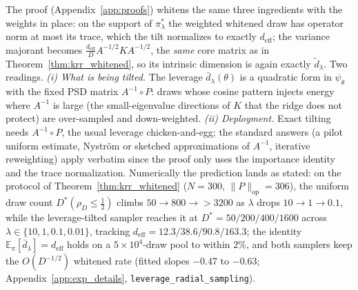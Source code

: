 \documentclass{article}
\begin{document}
\noindent The proof (Appendix~\ref{app:proofs}) whitens the same three ingredients with the weights in place: on the support of $\pi^*_\lambda$ the weighted whitened draw has operator norm at most its trace, which the tilt normalizes to exactly $d_{\mathrm{eff}}$; the variance majorant becomes $\frac{d_{\mathrm{eff}}}{D}A^{-1/2}KA^{-1/2}$, the \emph{same} core matrix as in Theorem~\ref{thm:krr_whitened}, so its intrinsic dimension is again exactly $\tilde d_\lambda$. Two readings. \emph{(i) What is being tilted.} The leverage $\bar d_\lambda(\theta)$ is a quadratic form in $\psi_\theta$ with the fixed PSD matrix $A^{-1}\circ P$: draws whose cosine pattern injects energy where $A^{-1}$ is large (the small-eigenvalue directions of $K$ that the ridge does not protect) are over-sampled and down-weighted. \emph{(ii) Deployment.} Exact tilting needs $A^{-1}\circ P$, the usual leverage chicken-and-egg; the standard answers (a pilot uniform estimate, Nystr\"om or sketched approximations of $A^{-1}$, iterative reweighting) apply verbatim since the proof only uses the importance identity and the trace normalization. Numerically the prediction lands as stated: on the protocol of Theorem~\ref{thm:krr_whitened} ($N{=}300$, $\|P\|_{\mathrm{op}}{=}306$), the uniform draw count $D^*(\rho_D\le\tfrac12)$ climbs $50\to800\to{>}3200$ as $\lambda$ drops $10\to1\to0.1$, while the leverage-tilted sampler reaches it at $D^*=50/200/400/1600$ across $\lambda\in\{10,1,0.1,0.01\}$, tracking $d_{\mathrm{eff}}=12.3/38.6/90.8/163.3$; the identity $\mathbb{E}_\pi[\bar d_\lambda]=d_{\mathrm{eff}}$ holds on a $5\times10^4$-draw pool to within $2\%$, and both samplers keep the $O(D^{-1/2})$ whitened rate (fitted slopes $-0.47$ to $-0.63$; Appendix~\ref{app:exp_details}, \texttt{leverage\_radial\_sampling}).
\end{document}
